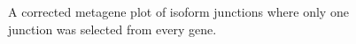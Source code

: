 \begin{figure}[hbt!]
    \begin{center}
        
    \end{center}
    \caption{A corrected metagene plot of isoform junctions where only one junction was selected from every gene.}
    \label{good_metagene}
\end{figure}